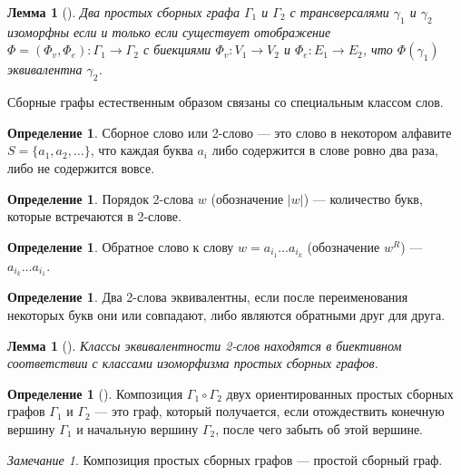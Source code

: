 \documentclass[a4paper,fleqn,12pt,top=0pt]{article}
\theoremstyle{plain}
\newtheorem{lemma}[theorem]{Лемма}
\theoremstyle{definition}
\newtheorem{definition}[theorem]{Определение}
\theoremstyle{remark}
\newtheorem{remark}[theorem]{Замечание}
\begin{document}
\begin{lemma}[]
    Два простых сборных графа $\Gamma_1$ и $\Gamma_2$ с трансверсалями $\gamma_1$ и $\gamma_2$ изоморфны если и только если существует отображение $\Phi = (\Phi_v, \Phi_e) : \Gamma_1 \rightarrow \Gamma_2$ с биекциями $\Phi_v: V_1 \rightarrow V_2$ и $\Phi_e: E_1 \rightarrow E_2$, что $\Phi(\gamma_1)$ эквивалентна $\gamma_2$.
\end{lemma}

Сборные графы естественным образом связаны со специальным классом слов.

\begin{definition}
    Сборное слово или 2-слово --- это слово в некотором алфавите $S = \{a_1, a_2, \dots\}$, что каждая буква $a_i$ либо содержится в слове ровно два раза, либо не содержится вовсе.
\end{definition}

\begin{definition}
    Порядок 2-слова $w$ (обозначение $|w|$) --- количество букв, которые встречаются в 2-слове.
\end{definition}

\begin{definition}
    Обратное слово к слову $w = a_{i_1} \dots a_{i_k}$ (обозначение $w^R$) --- $a_{i_k} \dots a_{i_1}$.
\end{definition}

\begin{definition}
    Два 2-слова эквивалентны, если после переименования некоторых букв они или совпадают, либо являются обратными друг для друга.
\end{definition}

\begin{lemma}[]
    Классы эквивалентности 2-слов находятся в биективном соответствии с классами изоморфизма простых сборных графов.
\end{lemma}

\begin{definition}[]
    Композиция $\Gamma_1 \circ \Gamma_2$ двух ориентированных простых сборных графов $\Gamma_1$ и $\Gamma_2$ --- это граф, который получается, если отождествить конечную вершину $\Gamma_1$ и начальную вершину $\Gamma_2$, после чего забыть об этой вершине.
\end{definition}

\begin{remark}
    Композиция простых сборных графов --- простой сборный граф.
\end{remark}
\end{document}

